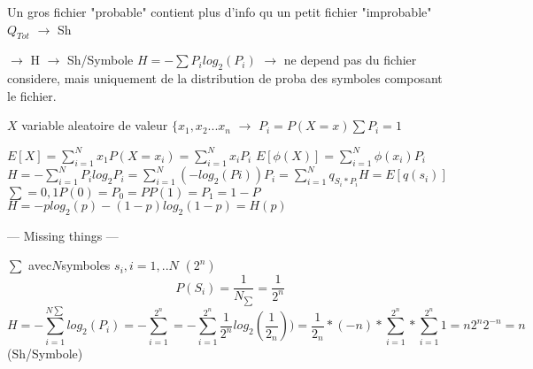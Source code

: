 \documentclass[a4paper,11pt]{article}
\begin{document}
Un gros fichier "probable" contient plus d'info qu un petit fichier "improbable"
$
Q_{Tot} $ $\rightarrow$ Sh

$\rightarrow$ H $\rightarrow$ Sh/Symbole
$
H = - \sum P_{i}log_{2}(P_{i})$ $\rightarrow$ ne depend pas du fichier considere, mais uniquement
de la distribution de proba des symboles composant le fichier.



$X$ variable aleatoire de valeur $ \{ x_{1}, x_{2} ... x_{n} $
$\rightarrow$ $P_{i} = P(X = x) \sum P_{i} = 1$

$
E[X] = \sum_{i=1}^{N} x_{1} P(X = x_{i}) = \sum_{i = 1}^{N} x_{i} P_{i}
$ $
E[\phi (X)] = \sum_{i=1}^{N} \phi (x_{i})P_{i}
$ $
H= - \sum_{i= 1}^{N}P_{i}log_{2}P_{i} = \sum_{i = 1}^{N} (-log_{2}(Pi)) P_{i} = \sum_{i = 1}^{N}q_{S_{i} * P_{i}}
H = E[q(s_{i})]
$ $
\sum = {0,1} P(0) = P_{0} = P
             P(1) = P_{1} = 1 - P
$ $
H = -p log_{2}(p) - (1 - p) log_{2}(1 - p)
  = H(p)
$

---
Missing things
---



$\sum$ avec$ N $symboles $s_{i}, i = 1, .. N$
                                 $   (2^{n})$
$$
P(S_{i}) = \frac{1}{N_{\sum}} = \frac{1}{ 2^{n}}$$
$$
H = - \sum_{i = 1}^{N\sum} log_{2}(P_{i}) = - \sum_{i = 1}^{2^{n}}
  = -\sum_{i = 1}^{2^{n}} \frac{1}{2^{n}} log_{2} (\frac{1}{ 2_{n}}))
  = \frac{1}{ 2_{n}} * (-n) * \sum_{i = 1}^{2^{n}} * \sum_{i = 1}^{2^{n}} 1  
  = n2^{n}2^{-n} = n $$     (Sh/Symbole)
\end{document}
